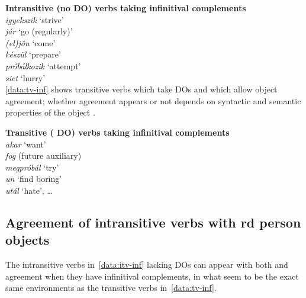 \ex\label{data:itv-inf}\textbf{Intransitive (no \Acc{} \gls{DO}) verbs taking infinitival complements}\\
    \emph{igyekszik} \enquote*{strive}\\
    \emph{jár} \enquote*{go (regularly)}\\
    \emph{(el)jön} \enquote*{come}\\
    \emph{készül} \enquote*{prepare}\\
    \emph{próbálkozik} \enquote*{attempt}\\
    \emph{siet} \enquote*{hurry}\\
\xe
\eqref{data:tv-inf} shows transitive verbs which take \Acc{} \glspl{DO} and
which allow object agreement; whether agreement appears or not depends on
syntactic and semantic properties of the object
\parencite{Bartos1999,EKiss2002,denDikken2006,CopWec2012b,Coppock2013P,Barany2015d,Barany2017}.

\ex\label{data:tv-inf}\textbf{Transitive (\Acc{} \gls{DO}) verbs taking infinitival complements}\\
    \emph{akar} \enquote*{want}\\
    \emph{fog} (future auxiliary)\\
    \emph{megpróbál} \enquote*{try}\\
    \emph{un} \enquote*{find boring}\\
    \emph{utál} \enquote*{hate}, \dots{}
\xe
%

\subsection{Agreement of intransitive verbs with \Third{}rd person
    objects}\label{sub:agr-3rd}

The intransitive verbs in~\eqref{data:itv-inf} lacking \Acc{} \glspl{DO} can
appear with both \Sbj{} and \Obj{} agreement when they have infinitival
complements, in what seem to be the exact same environments as the transitive
verbs in~\eqref{data:tv-inf}.

